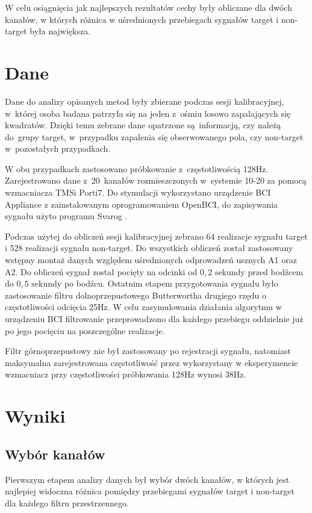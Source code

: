 \documentclass[licencjacka,openright]{pracamgr}
\begin{document}
W celu osiągnięcia jak najlepszych rezultatów cechy były obliczane dla dwóch kanałów, w których różnica w uśrednionych przebiegach sygnałów target i non-target była największa.

\chapter{Dane}
Dane do analizy opisanych metod były zbierane podczas sesji kalibracyjnej, w~której osoba badana patrzyła się na jeden z~ośmiu losowo zapalających się kwadratów. Dzięki temu zebrane dane opatrzone są~informacją, czy należą do~grupy target, w~przypadku zapalenia się obserwowanego pola, czy non-target w~pozostałych przypadkach.

W obu przypadkach zastosowano próbkowanie z~częstotliwością 128Hz. Zarejestrowano dane z~20~kanałów rozmieszczonych w~systemie 10-20 za pomocą wzmacniacza TMSi Porti7. Do stymulacji wykorzystano urządzenie BCI Appliance z zainstalowanym oprogramowaniem OpenBCI, do zapisywania sygnału użyto programu Svarog \citep{obci}.

Podczas użytej do obliczeń sesji kalibracyjnej zebrano 64 realizacje sygnału target i 528 realizacji sygnału non-target. Do wszystkich obliczeń został zastosowany wstępny montaż danych względem uśrednionych odprowadzeń usznych A1 oraz A2. Do obliczeń sygnał został pocięty na odcinki od $0{,}2$ sekundy przed bodźcem do $0{,}5$ sekundy po bodźcu. Ostatnim etapem przygotowania sygnału było zastosowanie filtru dolnoprzepustowego Butterwortha drugiego rzędu o częstotliwości odcięcia 25Hz. W celu zasymulowania działania algorytmu w urządzeniu BCI filtrowanie przeprowadzono dla każdego przebiegu oddzielnie już po jego pocięciu na poszczególne realizacje.

Filtr górnoprzepustowy nie był zastosowany po rejestracji sygnału, natomiast maksymalna zarejestrowana częstotliwość przez wykorzystany w eksperymencie wzmacniacz przy częstotliwości próbkowania 128Hz wynosi 38Hz.

\chapter{Wyniki}
\label{wyniki}

\section{Wybór kanałów}
\label{sygnaly}

Pierwszym etapem analizy danych był wybór dwóch kanałów, w których jest najlepiej widoczna różnica pomiędzy przebiegami sygnałów target i non-target dla każdego filtru przestrzennego. 
\end{document}
